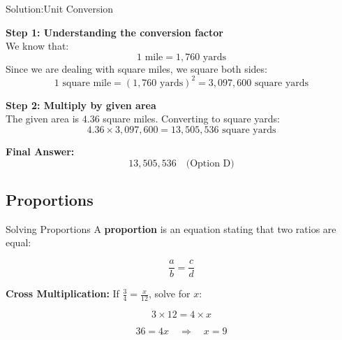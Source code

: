 \documentclass{beamer}
\begin{document}
\begin{frame}{Solution:Unit Conversion}

\textbf{Step 1: Understanding the conversion factor} \\
We know that:
\[
1 \text{ mile} = 1,760 \text{ yards}
\]
Since we are dealing with square miles, we square both sides:
\[
1 \text{ square mile} = (1,760 \text{ yards})^2 = 3,097,600 \text{ square yards}
\]

\textbf{Step 2: Multiply by given area} \\
The given area is \( 4.36 \) square miles. Converting to square yards:
\[
4.36 \times 3,097,600 = 13,505,536 \text{ square yards}
\]

\textbf{Final Answer:} \\
\[
\boxed{13,505,536} \quad \text{(Option D)}
\]

\end{frame}

\begin{frame}
\section{Proportions}
\end{frame}




\begin{frame}{Solving Proportions}
    A \textbf{proportion} is an equation stating that two ratios are equal:

    \[
    \frac{a}{b} = \frac{c}{d}
    \]

    \textbf{Cross Multiplication:} If \( \frac{3}{4} = \frac{x}{12} \), solve for \( x \):

    \[
    3 \times 12 = 4 \times x
    \]

    \[
    36 = 4x \quad \Rightarrow \quad x = 9
    \]
\end{frame}
\end{document}
